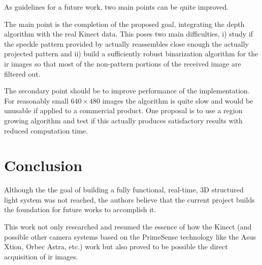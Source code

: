 \documentclass[journal]{IEEEtran}
\begin{document}
As guidelines for a future work, two main points can be quite improved.

The main point is the completion of the proposed goal, integrating the depth algorithm with the real Kinect data. This poses two main difficulties, i) study if the speckle pattern provided by \cite{landau2016kinect} actually reassembles close enough the actually projected pattern and ii) build a sufficiently robust binarization algorithm for the \gls{ir} images so that most of the non-pattern portions of the received image are filtered out. 

The secondary point should be to improve performance of the implementation. For reasonably small $640 \times 480$ images the algorithm is quite slow and would be unusable if applied to a commercial product. One proposal is to use a region growing algorithm and test if this actually produces satisfactory results with reduced computation time.



\section{Conclusion}

Although the the goal of building a fully functional, real-time, 3D structured light system was not reached, the authors believe that the current project builds the foundation for future works to accomplish it.

This work not only researched and resumed the essence of how the Kinect (and possible other camera systems based on the PrimeSense technology like the Asus Xtion, Orbec Astra, etc.) work but also proved to be possible the direct acquisition of \gls{ir} images.





%
\end{document}
